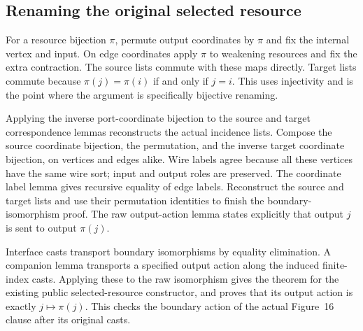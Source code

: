 \subsection{Renaming the original selected resource}
For a resource bijection $\pi$, permute output coordinates by $\pi$ and fix
the internal vertex and input. On edge coordinates apply $\pi$ to weakening
resources and fix the extra contraction. The source lists commute with these
maps directly. Target lists commute because
$\pi(j)=\pi(i)$ if and only if $j=i$. This uses injectivity and is the point
where the argument is specifically bijective renaming.


Applying the inverse port-coordinate bijection to the source and target
correspondence lemmas reconstructs the actual incidence lists. Compose the
source coordinate bijection, the permutation, and the inverse target
coordinate bijection, on vertices and edges alike. Wire labels agree because
all these vertices have the same wire sort; input and output roles are
preserved. The coordinate label lemma gives recursive equality of edge
labels. Reconstruct the source and target lists and use their permutation
identities to finish the boundary-isomorphism proof.
The raw output-action lemma states explicitly that output $j$ is sent to
output $\pi(j)$.


Interface casts transport boundary isomorphisms by equality elimination.
A companion lemma transports a specified output action along the induced
finite-index casts. Applying these to the raw isomorphism gives the theorem
for the existing public selected-resource constructor, and proves that its
output action is exactly $j\mapsto\pi(j)$. This checks the boundary action
of the actual Figure~16 clause after its original casts.


